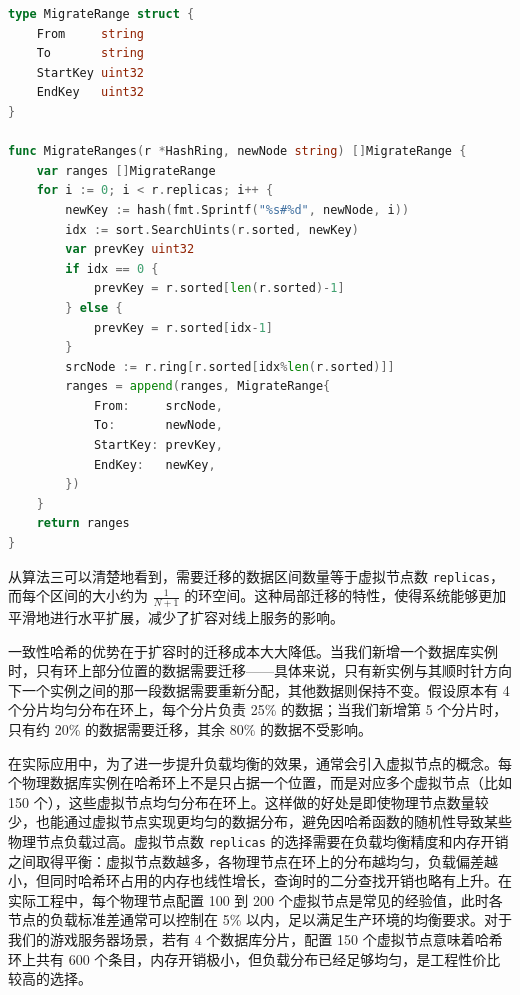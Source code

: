\begin{tcolorbox}[title=算法三：新增节点时计算需要迁移的数据范围]
\begin{lstlisting}[style=codeblock, language=go]
type MigrateRange struct {
    From     string
    To       string
    StartKey uint32
    EndKey   uint32
}

func MigrateRanges(r *HashRing, newNode string) []MigrateRange {
    var ranges []MigrateRange
    for i := 0; i < r.replicas; i++ {
        newKey := hash(fmt.Sprintf("%s#%d", newNode, i))
        idx := sort.SearchUints(r.sorted, newKey)
        var prevKey uint32
        if idx == 0 {
            prevKey = r.sorted[len(r.sorted)-1]
        } else {
            prevKey = r.sorted[idx-1]
        }
        srcNode := r.ring[r.sorted[idx%len(r.sorted)]]
        ranges = append(ranges, MigrateRange{
            From:     srcNode,
            To:       newNode,
            StartKey: prevKey,
            EndKey:   newKey,
        })
    }
    return ranges
}
\end{lstlisting}
\end{tcolorbox}

从算法三可以清楚地看到，需要迁移的数据区间数量等于虚拟节点数 \texttt{replicas}，而每个区间的大小约为 $\frac{1}{N+1}$ 的环空间。这种局部迁移的特性，使得系统能够更加平滑地进行水平扩展，减少了扩容对线上服务的影响。

一致性哈希的优势在于扩容时的迁移成本大大降低。当我们新增一个数据库实例时，只有环上部分位置的数据需要迁移——具体来说，只有新实例与其顺时针方向下一个实例之间的那一段数据需要重新分配，其他数据则保持不变。假设原本有 4 个分片均匀分布在环上，每个分片负责 25\% 的数据；当我们新增第 5 个分片时，只有约 20\% 的数据需要迁移，其余 80\% 的数据不受影响。

在实际应用中，为了进一步提升负载均衡的效果，通常会引入虚拟节点的概念。每个物理数据库实例在哈希环上不是只占据一个位置，而是对应多个虚拟节点（比如 150 个），这些虚拟节点均匀分布在环上。这样做的好处是即使物理节点数量较少，也能通过虚拟节点实现更均匀的数据分布，避免因哈希函数的随机性导致某些物理节点负载过高。虚拟节点数 \texttt{replicas} 的选择需要在负载均衡精度和内存开销之间取得平衡：虚拟节点数越多，各物理节点在环上的分布越均匀，负载偏差越小，但同时哈希环占用的内存也线性增长，查询时的二分查找开销也略有上升。在实际工程中，每个物理节点配置 100 到 200 个虚拟节点是常见的经验值，此时各节点的负载标准差通常可以控制在 5\% 以内，足以满足生产环境的均衡要求。对于我们的游戏服务器场景，若有 4 个数据库分片，配置 150 个虚拟节点意味着哈希环上共有 600 个条目，内存开销极小，但负载分布已经足够均匀，是工程性价比较高的选择。

